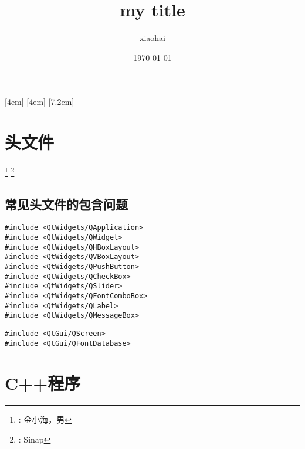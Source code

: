 \documentclass[11pt,UTF8,hyperref,openany]{ctexbook}
\author{xiaohai}
\date{\today{}}
\title{my title}
\begin{document}

\maketitle

[4em]{\addvspace{2.3mm}\bf}{%
  \contentslabel{4.0em}}{}{\titlerule*[5pt]{$\cdot$}\contentspage}
[4em]{}{\contentslabel{2.5em}}{}{%
  \titlerule*[5pt]{$\cdot$}\contentspage}
[7.2em]{}{\contentslabel{3.3em}}{}{%
  \titlerule*[5pt]{$\cdot$}\contentspage}
\tableofcontents


\chapter{头文件}
\renewcommand{\thefootnote}{}
\footnote{: 金小海，男}
\footnote{: Sinap}
\setcounter{footnote}{0}
\renewcommand{\thefootnote}{\arabic{footnote}}
\section{常见头文件的包含问题}
\begin{verbatim}
#include <QtWidgets/QApplication>
#include <QtWidgets/QWidget>
#include <QtWidgets/QHBoxLayout>
#include <QtWidgets/QVBoxLayout>
#include <QtWidgets/QPushButton>
#include <QtWidgets/QCheckBox>
#include <QtWidgets/QSlider>
#include <QtWidgets/QFontComboBox>
#include <QtWidgets/QLabel>
#include <QtWidgets/QMessageBox>
\end{verbatim}

\begin{verbatim}
#include <QtGui/QScreen>
#include <QtGui/QFontDatabase>
\end{verbatim}








\appendix
\chapter{C++程序}
\end{document}
